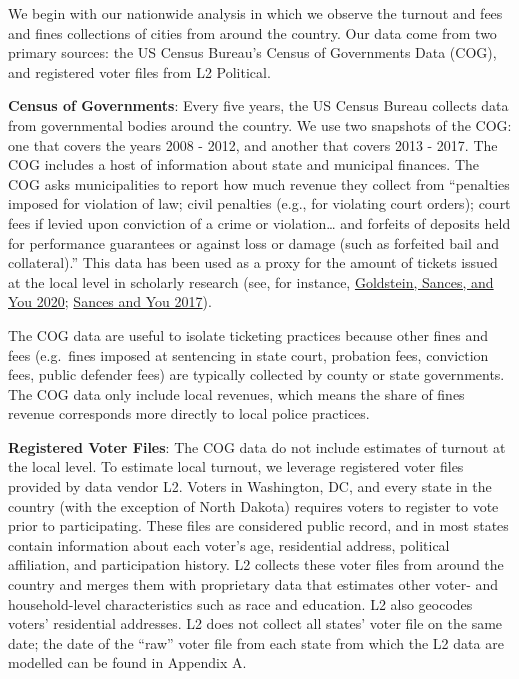 \documentclass[
  12pt,
]{article}
\begin{document}
We begin with our nationwide analysis in which we observe the turnout and fees and fines collections of cities from around the country. Our data come from two primary sources: the US Census Bureau's Census of Governments Data (COG), and registered voter files from L2 Political.

\textbf{Census of Governments}: Every five years, the US Census Bureau collects data from governmental bodies around the country. We use two snapshots of the COG: one that covers the years 2008 - 2012, and another that covers 2013 - 2017. The COG includes a host of information about state and municipal finances. The COG asks municipalities to report how much revenue they collect from ``penalties imposed for violation of law; civil penalties (e.g., for violating court orders); court fees if levied upon conviction of a crime or violation\ldots{} and forfeits of deposits held for performance guarantees or against loss or damage (such as forfeited bail and collateral).'' This data has been used as a proxy for the amount of tickets issued at the local level in scholarly research (see, for instance, \protect\hyperlink{ref-Goldstein2020}{Goldstein, Sances, and You 2020}; \protect\hyperlink{ref-Sances2017}{Sances and You 2017}).

The COG data are useful to isolate ticketing practices because other fines and fees (e.g.~fines imposed at sentencing in state court, probation fees, conviction fees, public defender fees) are typically collected by county or state governments. The COG data only include local revenues, which means the share of fines revenue corresponds more directly to local police practices.

\textbf{Registered Voter Files}: The COG data do not include estimates of turnout at the local level. To estimate local turnout, we leverage registered voter files provided by data vendor L2. Voters in Washington, DC, and every state in the country (with the exception of North Dakota) requires voters to register to vote prior to participating. These files are considered public record, and in most states contain information about each voter's age, residential address, political affiliation, and participation history. L2 collects these voter files from around the country and merges them with proprietary data that estimates other voter- and household-level characteristics such as race and education. L2 also geocodes voters' residential addresses. L2 does not collect all states' voter file on the same date; the date of the ``raw'' voter file from each state from which the L2 data are modelled can be found in Appendix A.
\end{document}
